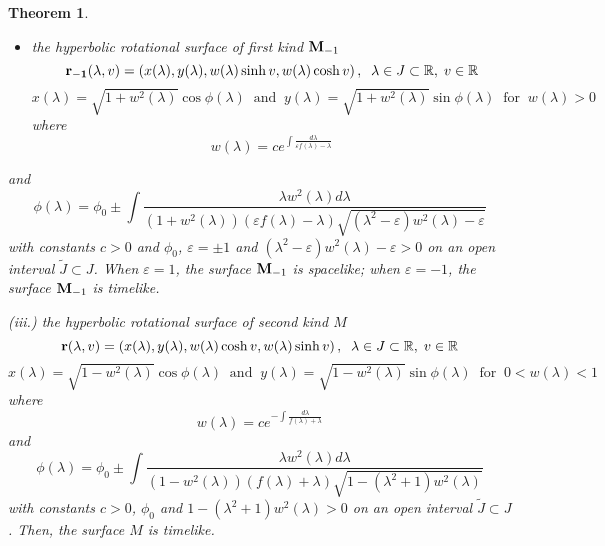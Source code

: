 \documentclass{amsart}
\newtheorem{Theorem}{Theorem}[section]
\theoremstyle{definition}
\numberwithin{equation}{section}
\begin{document}
\begin{Theorem}
\begin{itemize}
\item [(ii.)] the hyperbolic rotational surface of first kind ${\bf M}_{-1}$
\begin{equation}
\label{hyper1kind1}
    {\bf{r}_{-1}}(\lambda,v)=\left(x(\lambda), y(\lambda), w(\lambda)\sinh{v}, w(\lambda)\cosh{v}\right),\;\;
    \lambda\in J\subset\mathbb{R},\;v\in\mathbb{R}
\end{equation}
\begin{equation}
     \label{hyper1kind3}
     x(\lambda)=\sqrt{1+w^2(\lambda)}\cos{\phi(\lambda)}\;\;\mbox{and}\;\; 
     y(\lambda)=\sqrt{1+w^2(\lambda)}\sin{\phi(\lambda)}\;\;
     \mbox{for}\;\;w(\lambda)>0
    \end{equation}
where 
\begin{equation}
\label{hyper1kind2}
w(\lambda)=ce^{\int{\frac{d\lambda}{\varepsilon f(\lambda)-\lambda}}}
\end{equation}
\end{itemize}
and 
\begin{equation}
 \label{hyper1kind4}
 \phi(\lambda)=\phi_0\pm\int{\frac{\lambda w^2(\lambda) d\lambda}{(1+w^2(\lambda))(\varepsilon f(\lambda)-\lambda)\sqrt{(\lambda^2-\varepsilon)w^2(\lambda)-\varepsilon}}}
\end{equation}
with constants $c>0$ and $\phi_0$, $\varepsilon=\pm 1$ and 
$(\lambda^2-\varepsilon)w^2(\lambda)-\varepsilon>0$ on an open interval 
$\tilde{J}\subset J$.
When $\varepsilon=1$, the surface ${\bf M}_{-1}$ 
is spacelike; 
when $\varepsilon=-1$, the surface ${\bf M}_{-1}$ 
is timelike. 

\item {(iii.)} the hyperbolic rotational surface of second kind $M$
\begin{equation}
\label{hyper2kind1}
    {\bf{r}}(\lambda,v)=\left(x(\lambda), y(\lambda), w(\lambda)\cosh{v}, w(\lambda)\sinh{v}\right),\;\;
    \lambda\in J\subset\mathbb{R},\;v\in\mathbb{R}
\end{equation}
\begin{equation}
     \label{hyper2kind3}
     x(\lambda)=\sqrt{1-w^2(\lambda)}\cos{\phi(\lambda)}\;\;\mbox{and}\;\; 
     y(\lambda)=\sqrt{1-w^2(\lambda)}\sin{\phi(\lambda)}\;\;
     \mbox{for}\;\;0<w(\lambda)<1
    \end{equation}
where 
\begin{equation}
\label{hyper2kind2}
w(\lambda)=ce^{-\int{\frac{d\lambda}{f(\lambda)+\lambda}}}
\end{equation}
and 
\begin{equation}
 \label{hyper2kind4}
 \phi(\lambda)=\phi_0\pm\int{\frac{\lambda w^2(\lambda) d\lambda}{(1-w^2(\lambda))(f(\lambda)+\lambda)
 \sqrt{1-(\lambda^2+1)w^2(\lambda)}}}
\end{equation}
with constants $c>0$, $\phi_0$ and $1-(\lambda^2+1)w^2(\lambda)>0$ on 
an open interval $\tilde{J}\subset J$. 
Then, the surface $M$ is timelike.


\end{Theorem}
\end{document}
